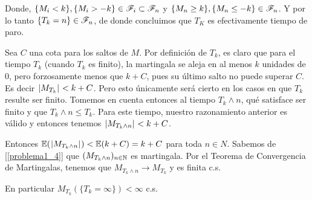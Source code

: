 Donde, $\{ M_i < k \}, \{ M_i > -k \} \in \mathscr{F}_i \subset \mathscr{F}_n$ y $\{ M_n \geq k \}, \{ M_n \leq -k \} \in \mathscr{F}_n$. 
Y por lo tanto $\{ T_k = n\} \in \mathscr{F}_n$, de donde concluimos que $T_K$ es efectivamente tiempo de paro.\par\null


Sea $C$ una cota para los saltos de $M$. Por definición de $T_k$, es claro que para el tiempo $T_k$ (cuando $T_k$ es finito), 
la martingala se aleja en al menos $k$ unidades de 0, pero forzosamente menos que $k + C$, pues su último salto no 
puede superar $C$. Es decir $\hspace{.25mm}\left|M_{T_k}\right|\hspace{.25mm} < k + C$. Pero esto únicamente será cierto en los casos en que $T_k$ resulte 
ser finito. Tomemos en cuenta entonces al tiempo $T_k \wedge n$, qué satisface ser finito y que $T_k \wedge n \leq T_k$. 
Para este tiempo, nuestro razonamiento anterior es válido y entonces tenemos $\hspace{.25mm}\left|M_{T_k \wedge n}\right|\hspace{.25mm} < k + C$.\par\null

Entonces $\mathbb{E}(\hspace{.25mm}\left|M_{T_k \wedge n}\right|\hspace{.25mm}) < \mathbb{E}(k + C) = k + C$ para toda $n \in N$. Sabemos de [\ref{problema1_4}] que 
$(M_{T_k \wedge n})_{n \in \mathbb{N}}$ es martingala. Por el Teorema de Convergencia de Martingalas, tenemos que 
$M_{T_k \wedge n} \longrightarrow M_{T_k}$ y es finita c.s.\par\null

En particular $M_{T_k}(\{ T_k = \infty \}) < \infty$ c.s.\par\null


